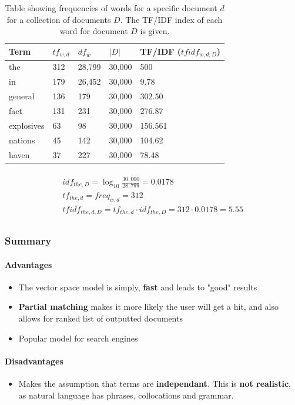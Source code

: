 \documentclass{article}
\begin{document}
\begin{table}[H]
	\centering
	\begin{tabular}{|l|l|l|l|l|}
		\hline
		\textbf{Term} & $tf_{w,d}$ & $df_w$ & $|D|$ & TF/IDF ($tfidf_{w,d,D}$) \\
		\hline
		the & 312 & 28,799 & 30,000 & 500 \\
		in & 179 & 26,452 & 30,000 & 9.78 \\
		general & 136 & 179 & 30,000 & 302.50 \\
		fact & 131 & 231 & 30,000 & 276.87 \\
		explosives & 63 & 98 & 30,000 & 156.561 \\
		nations & 45 & 142 & 30,000 & 104.62 \\
		haven & 37 & 227 & 30,000 & 78.48 \\
		\hline
	\end{tabular}
	\caption{Table showing frequencies of words for a specific document $d$ for a collection of documents $D$. The TF/IDF index of each word for document $D$ is given.}
	\label{tab:tf-idf}
\end{table}

\begin{multline}\\
	idf_{the,D} = \log_{10} \frac{30,000}{28,799} = 0.0178 \\
	tf_{the,d} = freq_{w,d} = 312 \\
	tfidf_{the,d,D} = tf_{the,d} \cdot idf_{the,D} = 312 \cdot 0.0178 = 5.55 \\
	\label{eq:tf-idf-example}
\end{multline}

\subsubsection{Summary}

\paragraph{\textbf{Advantages}}
\begin{itemize}
	\item The vector space model is simply, \textbf{fast} and leads to "good" results
	\item \textbf{Partial matching} makes it more likely the user will get a hit, and also allows for ranked list of outputted documents
	\item Popular model for search engines
\end{itemize}
\paragraph{\textbf{Disadvantages}}
\begin{itemize}
	\item Makes the assumption that terms are \textbf{independant}. This is \textbf{not realistic}, as natural language has phrases, collocations and grammar.
\end{itemize}
\end{document}
